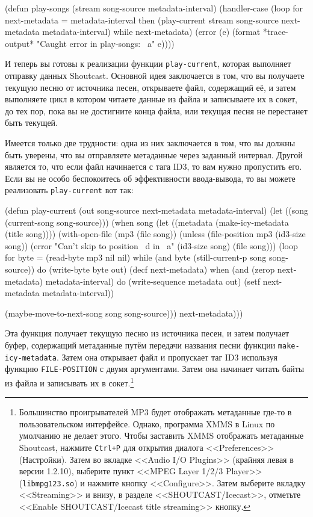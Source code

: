 \begin{myverb}
(defun play-songs (stream song-source metadata-interval)
  (handler-case 
      (loop
         for next-metadata = metadata-interval
         then (play-current 
               stream 
               song-source
               next-metadata
               metadata-interval)
         while next-metadata)
    (error (e) (format *trace-output* "Caught error in play-songs: ~a" e))))
\end{myverb}

И теперь вы готовы к реализации функции \lstinline{play-current}, которая выполняет отправку
данных Shoutcast.  Основной идея заключается в том, что вы получаете текущую песню от
источника песен, открываете файл, содержащий её, и затем выполняете цикл в котором читаете
данные из файла и записываете их в сокет, до тех пор, пока вы не достигните конца файла,
или текущая песня не перестанет быть текущей.

Имеется только две трудности: одна из них заключается в том, что вы должны быть уверены,
что вы отправляете метаданные через заданный интервал.  Другой является то, что если файл
начинается с тага ID3, то вам нужно пропустить его.  Если вы не особо беспокоитесь об
эффективности ввода-вывода, то вы можете реализовать \lstinline{play-current} вот так:

\begin{myverb}
(defun play-current (out song-source next-metadata metadata-interval)
  (let ((song (current-song song-source)))
    (when song
      (let ((metadata (make-icy-metadata (title song))))
        (with-open-file (mp3 (file song))
          (unless (file-position mp3 (id3-size song))
            (error "Can't skip to position ~d in ~a" (id3-size song) (file song)))
          (loop for byte = (read-byte mp3 nil nil)
             while (and byte (still-current-p song song-source)) do
               (write-byte byte out)
               (decf next-metadata)
             when (and (zerop next-metadata) metadata-interval) do
               (write-sequence metadata out)
               (setf next-metadata metadata-interval))

          (maybe-move-to-next-song song song-source)))
      next-metadata)))
\end{myverb}

Эта функция получает текущую песню из источника песен, и затем получает буфер, содержащий
метаданные путём передачи названия песни функции \lstinline{make-icy-metadata}.  Затем она
открывает файл и пропускает таг ID3 используя функцию \lstinline{FILE-POSITION} с двумя
аргументами.  Затем она начинает читать байты из файла и записывать их в
сокет.\footnote{Большинство проигрывателей MP3 будет отображать метаданные где-то в
  пользовательском интерфейсе.  Однако, программа XMMS в Linux по умолчанию не делает
  этого. Чтобы заставить XMMS отображать метаданные Shoutcast, нажмите \lstinline{Ctrl+P} для
  открытия диалога <<Preferences>> (Настройки).  Затем во вкладке <<Audio I/O Plugins>>
  (крайняя левая в версии 1.2.10), выберите пункт <<MPEG Layer 1/2/3 Player>>
  (\lstinline{libmpg123.so}) и нажмите кнопку <<Configure>>.  Затем выберите вкладку
  <<Streaming>> и внизу, в разделе <<SHOUTCAST/Icecast>>, отметьте <<Enable
  SHOUTCAST/Icecast title streaming>> кнопку.}

